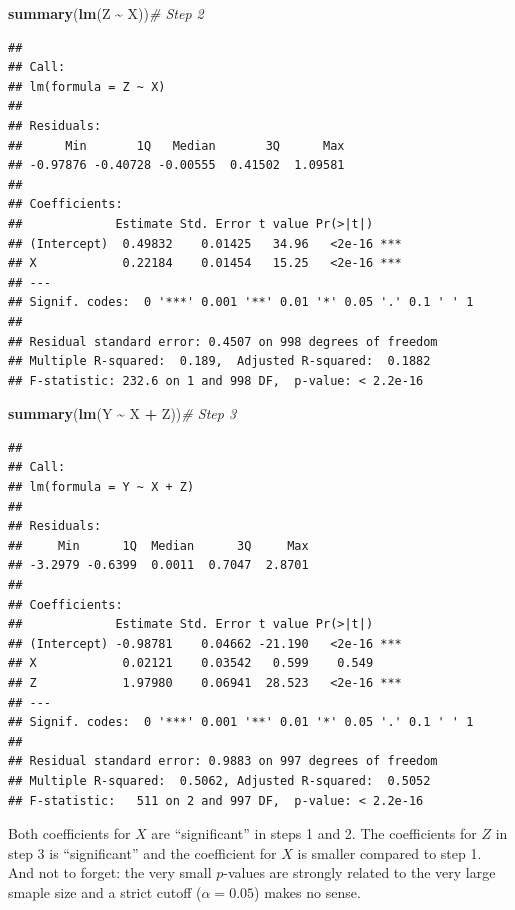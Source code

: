 \documentclass[
]{book}
\newenvironment{Shaded}{\begin{snugshade}}{\end{snugshade}}
\newcommand{\CommentTok}[1]{\textcolor[rgb]{0.56,0.35,0.01}{\textit{#1}}}
\newcommand{\FunctionTok}[1]{\textcolor[rgb]{0.13,0.29,0.53}{\textbf{#1}}}
\newcommand{\NormalTok}[1]{#1}
\newcommand{\SpecialCharTok}[1]{\textcolor[rgb]{0.81,0.36,0.00}{\textbf{#1}}}
\begin{document}
\begin{Shaded}
\begin{Highlighting}[]
\FunctionTok{summary}\NormalTok{(}\FunctionTok{lm}\NormalTok{(Z }\SpecialCharTok{\textasciitilde{}}\NormalTok{ X))}\CommentTok{\# Step 2}
\end{Highlighting}
\end{Shaded}

\begin{verbatim}
## 
## Call:
## lm(formula = Z ~ X)
## 
## Residuals:
##      Min       1Q   Median       3Q      Max 
## -0.97876 -0.40728 -0.00555  0.41502  1.09581 
## 
## Coefficients:
##             Estimate Std. Error t value Pr(>|t|)    
## (Intercept)  0.49832    0.01425   34.96   <2e-16 ***
## X            0.22184    0.01454   15.25   <2e-16 ***
## ---
## Signif. codes:  0 '***' 0.001 '**' 0.01 '*' 0.05 '.' 0.1 ' ' 1
## 
## Residual standard error: 0.4507 on 998 degrees of freedom
## Multiple R-squared:  0.189,  Adjusted R-squared:  0.1882 
## F-statistic: 232.6 on 1 and 998 DF,  p-value: < 2.2e-16
\end{verbatim}

\begin{Shaded}
\begin{Highlighting}[]
\FunctionTok{summary}\NormalTok{(}\FunctionTok{lm}\NormalTok{(Y }\SpecialCharTok{\textasciitilde{}}\NormalTok{ X }\SpecialCharTok{+}\NormalTok{ Z))}\CommentTok{\# Step 3}
\end{Highlighting}
\end{Shaded}

\begin{verbatim}
## 
## Call:
## lm(formula = Y ~ X + Z)
## 
## Residuals:
##     Min      1Q  Median      3Q     Max 
## -3.2979 -0.6399  0.0011  0.7047  2.8701 
## 
## Coefficients:
##             Estimate Std. Error t value Pr(>|t|)    
## (Intercept) -0.98781    0.04662 -21.190   <2e-16 ***
## X            0.02121    0.03542   0.599    0.549    
## Z            1.97980    0.06941  28.523   <2e-16 ***
## ---
## Signif. codes:  0 '***' 0.001 '**' 0.01 '*' 0.05 '.' 0.1 ' ' 1
## 
## Residual standard error: 0.9883 on 997 degrees of freedom
## Multiple R-squared:  0.5062, Adjusted R-squared:  0.5052 
## F-statistic:   511 on 2 and 997 DF,  p-value: < 2.2e-16
\end{verbatim}

Both coefficients for \(X\) are ``significant'' in steps 1 and 2.
The coefficients for \(Z\) in step 3 is ``significant'' and the coefficient for
\(X\) is smaller compared to step 1. And not to forget: the very small \(p\)-values are strongly
related to the very large smaple size and a strict cutoff (\(\alpha = 0.05\)) makes no sense.
\end{document}
